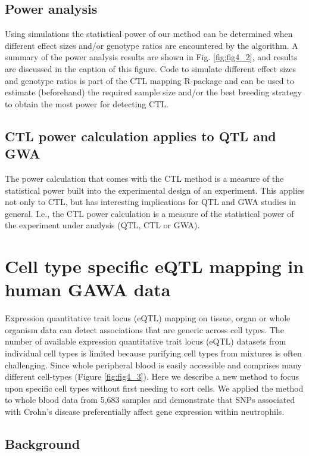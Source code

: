   \subsection{Power analysis}
  Using simulations the statistical power of our method can be determined when different effect sizes and/or genotype ratios 
  are encountered by the algorithm. A summary of the power analysis results are shown in Fig. \ref{fig:fig4_2}, and results 
  are discussed in the caption of this figure. 
  Code to simulate different effect sizes and genotype ratios is part of the CTL mapping R-package and can be used 
  to estimate (beforehand) the required sample size and/or the best breeding strategy to obtain the most power for detecting 
  CTL.

  \subsection{CTL power calculation applies to QTL and GWA}
  The power calculation that comes with the CTL method is a measure of the statistical power built into the experimental design 
  of an experiment. This applies not only to CTL, but has interesting implications for QTL and GWA studies in general. I.e., 
  the CTL power calculation is a measure of the statistical power of the experiment under analysis (QTL, CTL or GWA).


\section{Cell type specific eQTL mapping in human GAWA data}
\label{sec:cellspecificeqtl}
  Expression quantitative trait locus (eQTL) mapping on tissue, organ or whole organism data can detect associations that 
  are generic across cell types.  The number of available expression quantitative trait locus (eQTL) datasets from individual 
  cell types is limited because purifying cell types from mixtures is often challenging.  Since whole peripheral blood is 
  easily accessible and comprises many different cell-types (Figure \ref{fig:fig4_3}). Here we describe a new method to 
  focus upon specific cell types without first needing to sort  cells. We applied the method to whole blood data from 
  5,683 samples and demonstrate that SNPs associated with Crohn's  disease preferentially affect gene expression within neutrophils.
  \subsection{Background}

